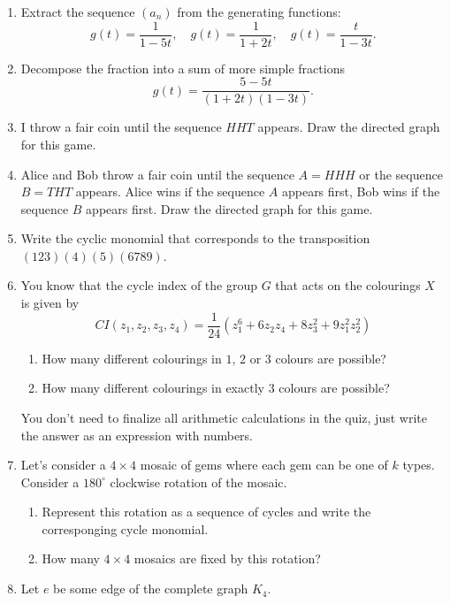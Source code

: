 \documentclass[12pt]{article}
\begin{document}
\begin{enumerate}
    \item[7.1.] Extract the sequence $(a_n)$ from the generating functions:
    \[
    g(t) = \frac{1}{1 - 5t}, \quad g(t) = \frac{1}{1 + 2t}, \quad g(t) = \frac{t}{1 - 3t}.
    \]
    \item[7.2.] Decompose the fraction into a sum of more simple fractions
    \[
    g(t) = \frac{5 - 5t}{(1 + 2t)(1-3t)}.
    \]

    \newpage
 
    \item[10.1] I throw a fair coin until the sequence $HHT$ appears. 
    Draw the directed graph for this game.
    \item[10.2] Alice and Bob throw a fair coin until the sequence $A = HHH$ or the sequence $B = THT$ appears.
Alice wins if the sequence $A$ appears first, Bob wins if the sequence $B$ appears first.
 Draw the directed graph for this game.

  
     \item[11.1] Write the cyclic monomial that corresponds to the transposition $(123)(4)(5)(6789)$.
    
    \item[11.2] You know that the cycle index of the group $G$ that acts on the colourings $X$ is given by 
    \[
    CI(z_1, z_2, z_3, z_4) = \frac{1}{24}(z_1^6 + 6z_2z_4 + 8z_3^2 + 9z_1^2 z_2^2)
    \]
    \begin{enumerate}[label=\alph*)]
        \item How many different colourings in $1$, $2$ or $3$ colours are possible?
        \item How many different colourings in exactly $3$ colours are possible?
    \end{enumerate}

    You don't need to finalize all arithmetic calculations in the quiz, just write the answer as an expression with numbers. 


    \item[12] Let's consider a $4 \times 4$ mosaic of gems where each gem can be one of $k$ types. 
Consider a $180^{\circ}$ clockwise rotation of the mosaic.
\begin{enumerate}
    \item[12.1] Represent this rotation as a sequence of cycles and write the corresponging cycle monomial. 
    \item[12.2] How many $4\times 4$ mosaics are fixed by this rotation?
\end{enumerate}
    \item[13.1] Let $e$ be some edge of the complete graph $K_4$. 
    

\end{enumerate}
\end{document}
